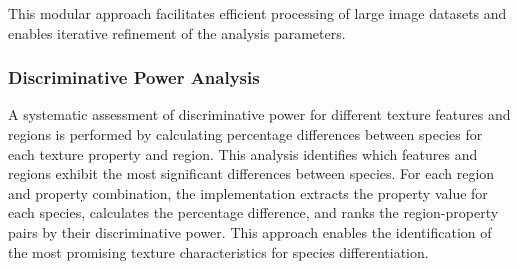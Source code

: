 \documentclass[a4paper,12pt]{report}
\begin{document}




This modular approach facilitates efficient processing of large image datasets and enables iterative refinement of the analysis parameters.

\subsubsection{Discriminative Power Analysis}
A systematic assessment of discriminative power for different texture features and regions is performed by calculating percentage differences between species for each texture property and region. This analysis identifies which features and regions exhibit the most significant differences between species. For each region and property combination, the implementation extracts the property value for each species, calculates the percentage difference, and ranks the region-property pairs by their discriminative power. This approach enables the identification of the most promising texture characteristics for species differentiation.
\end{document}

